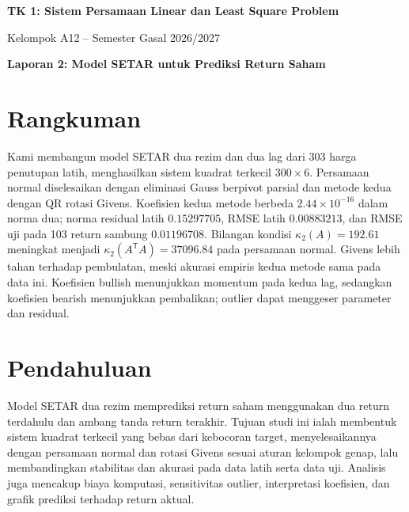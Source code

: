 \documentclass[12pt,a4paper]{article}
\numberwithin{equation}{section}
\begin{document}
\setcounter{page}{2}
\begin{center}
{\large\bfseries TK 1: Sistem Persamaan Linear dan Least Square Problem}\par\medskip
Kelompok A12 -- Semester Gasal 2026/2027
\end{center}
\setcounter{tocdepth}{1}
\tableofcontents
\clearpage

\clearpage
\begin{center}{\large\bfseries Laporan 2: Model SETAR untuk Prediksi Return Saham}\end{center}
\setcounter{section}{0}
\section*{Rangkuman}
Kami membangun model SETAR dua rezim dan dua lag dari 303 harga penutupan latih, menghasilkan sistem kuadrat terkecil $300\times6$. Persamaan normal diselesaikan dengan eliminasi Gauss berpivot parsial dan metode kedua dengan QR rotasi Givens. Koefisien kedua metode berbeda $2.44\times10^{-16}$ dalam norma dua; norma residual latih $0.15297705$, RMSE latih $0.00883213$, dan RMSE uji pada 103 return sambung $0.01196708$. Bilangan kondisi $\kappa_2(A)=192.61$ meningkat menjadi $\kappa_2(A^\mathsf{T}A)=37096.84$ pada persamaan normal. Givens lebih tahan terhadap pembulatan, meski akurasi empiris kedua metode sama pada data ini. Koefisien bullish menunjukkan momentum pada kedua lag, sedangkan koefisien bearish menunjukkan pembalikan; outlier dapat menggeser parameter dan residual.
\section{Pendahuluan}
Model SETAR dua rezim memprediksi return saham menggunakan dua return terdahulu dan ambang tanda return terakhir. Tujuan studi ini ialah membentuk sistem kuadrat terkecil yang bebas dari kebocoran target, menyelesaikannya dengan persamaan normal dan rotasi Givens sesuai aturan kelompok genap, lalu membandingkan stabilitas dan akurasi pada data latih serta data uji. Analisis juga mencakup biaya komputasi, sensitivitas outlier, interpretasi koefisien, dan grafik prediksi terhadap return aktual.\par
\end{document}
